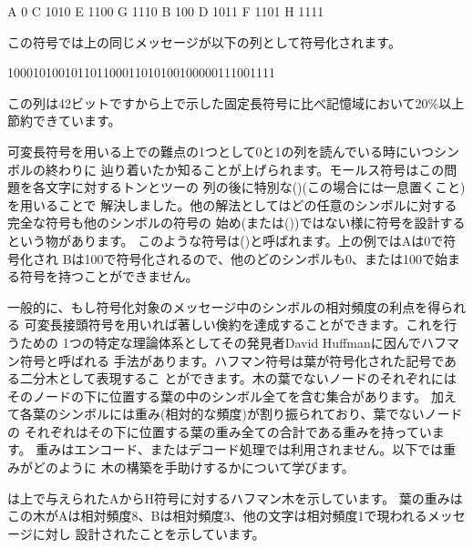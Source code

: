 \begin{example}
A 0      C 1010    E 1100    G 1110
B 100    D 1011    F 1101    H 1111
\end{example}

\noindent
この符号では上の同じメッセージが以下の列として符号化されます。

\begin{example}
100010100101101100011010100100000111001111
\end{example}

\noindent
この列は42ビットですから上で示した固定長符号に比べ記憶域において20\%以上節約できています。



可変長符号を用いる上での難点の1つとして0と1の列を読んでいる時にいつシンボルの終わりに
辿り着いたか知ることが上げられます。モールス符号はこの問題を各文字に対するトンとツーの
列の後に特別な()(この場合には一息置くこと)を用いることで
解決しました。他の解法としてはどの任意のシンボルに対する完全な符号も他のシンボルの符号の
始め(または())ではない様に符号を設計するという物があります。
このような符号は()と呼ばれます。上の例ではAは0で符号化され
Bは100で符号化されるので、他のどのシンボルも0、または100で始まる符号を持つことができません。



一般的に、もし符号化対象のメッセージ中のシンボルの相対頻度の利点を得られる
可変長接頭符号を用いれば著しい倹約を達成することができます。これを行うための
1つの特定な理論体系としてその発見者David Huffmanに因んでハフマン符号と呼ばれる
手法があります。ハフマン符号は葉が符号化された記号である二分木として表現するこ
とができます。木の葉でないノードのそれぞれには
そのノードの下に位置する葉の中のシンボル全てを含む集合があります。
加えて各葉のシンボルには重み(相対的な頻度)が割り振られており、葉でないノードの
それぞれはその下に位置する葉の重み全ての合計である重みを持っています。
重みはエンコード、またはデコード処理では利用されません。以下では重みがどのように
木の構築を手助けするかについて学びます。



は上で与えられたAからH符号に対するハフマン木を示しています。
葉の重みは
この木がAは相対頻度8、Bは相対頻度3、他の文字は相対頻度1で現われるメッセージに対し
設計されたことを示しています。

